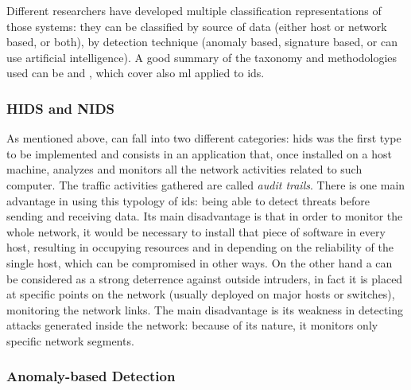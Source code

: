 Different researchers have developed multiple classification representations of those systems: they can be classified by source of data (either host or network based, or both), by detection technique (anomaly based, signature based, or can use artificial intelligence). A good summary of the taxonomy and methodologies used can be \cite{Hodo2017} and \cite{Liu2019}, which cover also \gls{ml} applied to \gls{ids}.


\subsubsection{HIDS and NIDS}
\label{subsubsec:hids-nids}

As mentioned above,  can fall into two different categories: \gls{hids} was the first type to be implemented \cite{Debar1999} and consists in an application that, once installed on a host machine, analyzes and monitors all the network activities related to such computer. The traffic activities gathered are called \textit{audit trails}. There is one main advantage in using this typology of \gls{ids}: being able to detect threats before sending and receiving data. Its main disadvantage is that in order to monitor the whole network, it would be necessary to install that piece of software in every host, resulting in occupying resources and in depending on the reliability of the single host, which can be compromised in other ways. On the other hand a  can be considered as a strong deterrence against outside intruders, in fact it is placed at specific points on the network (usually deployed on major hosts or switches), monitoring the network links. The main disadvantage is its weakness in detecting attacks generated inside the network: because of its nature, it monitors only specific network segments.


\subsubsection{Anomaly-based Detection}
\label{subsubsec:anomaly-detection}

